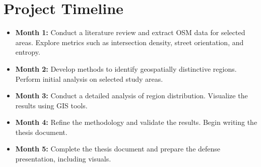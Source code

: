 \documentclass[12pt]{article}
\begin{document}
\section*{Project Timeline}
\begin{itemize}
    \item \textbf{Month 1:} Conduct a literature review and extract OSM data for selected areas. Explore metrics such as intersection density, street orientation, and entropy.
    \item \textbf{Month 2:} Develop methods to identify geospatially distinctive regions. Perform initial analysis on selected study areas.
    \item \textbf{Month 3:} Conduct a detailed analysis of region distribution. Visualize the results using GIS tools.
    \item \textbf{Month 4:} Refine the methodology and validate the results. Begin writing the thesis document.
    \item \textbf{Month 5:} Complete the thesis document and prepare the defense presentation, including visuals.
\end{itemize}



\end{document}
